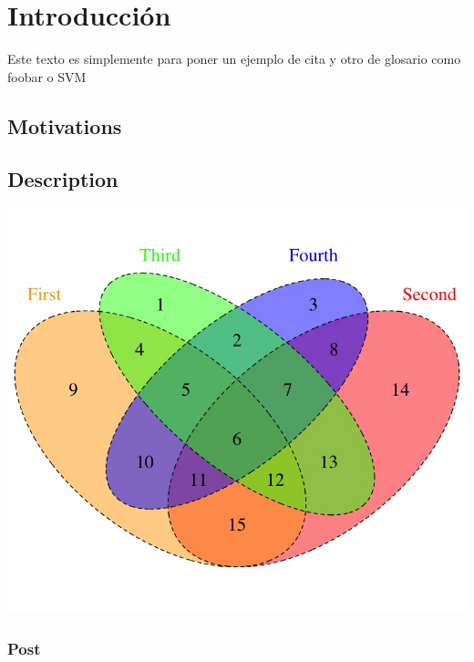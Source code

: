 \chapter{Introducción} \label{Intro} 
 

Este texto es simplemente para poner un ejemplo de cita \cite{Yandell2012} y otro de glosario como \gls{foobar} o \gls{SVM}

\section{Motivations}
\lipsum[1-4]

\section{Description}

\begin{tcolorbox}[colback=blue!5,colframe=blue!40!black,title=Box 1: ]
\lipsum[2]
\includegraphics[scale=0.15]{figures/Venn}
\end{tcolorbox}

\subsection{Post}
\lipsum[1-2]

